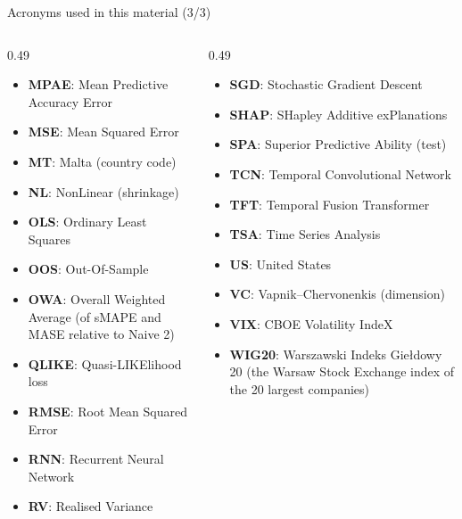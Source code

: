 \begin{frame}{Acronyms used in this material (3/3)}
\begin{columns}[T]
\begin{column}{0.49\textwidth}
\begin{itemize}\setlength{\itemsep}{0pt}
    \item \textbf{MPAE}: Mean Predictive Accuracy Error
    \item \textbf{MSE}: Mean Squared Error
    \item \textbf{MT}: Malta (country code)
    \item \textbf{NL}: NonLinear (shrinkage)
    \item \textbf{OLS}: Ordinary Least Squares
    \item \textbf{OOS}: Out-Of-Sample
    \item \textbf{OWA}: Overall Weighted Average (of sMAPE and MASE relative to Naive 2)
    \item \textbf{QLIKE}: Quasi-LIKElihood loss
    \item \textbf{RMSE}: Root Mean Squared Error
    \item \textbf{RNN}: Recurrent Neural Network
    \item \textbf{RV}: Realised Variance
\end{itemize}
\end{column}
\begin{column}{0.49\textwidth}
\begin{itemize}\setlength{\itemsep}{0pt}
    \item \textbf{SGD}: Stochastic Gradient Descent
    \item \textbf{SHAP}: SHapley Additive exPlanations
    \item \textbf{SPA}: Superior Predictive Ability (test)
    \item \textbf{TCN}: Temporal Convolutional Network
    \item \textbf{TFT}: Temporal Fusion Transformer
    \item \textbf{TSA}: Time Series Analysis
    \item \textbf{US}: United States
    \item \textbf{VC}: Vapnik–Chervonenkis (dimension)
    \item \textbf{VIX}: CBOE Volatility IndeX
    \item \textbf{WIG20}: Warszawski Indeks Giełdowy 20 (the Warsaw Stock Exchange index of the 20 largest companies)
\end{itemize}
\end{column}
\end{columns}
\end{frame}

